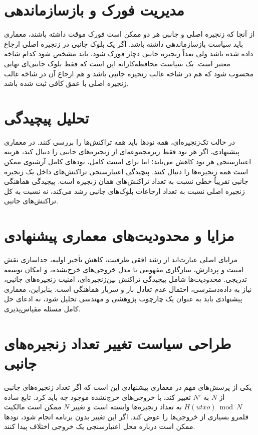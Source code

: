 \section{مدیریت فورک و بازسازماندهی}

از آنجا که زنجیره اصلی و جانبی هر دو ممکن است فورک موقت داشته باشند، معماری باید سیاست بازسازماندهی داشته باشد. اگر یک بلوک جانبی در زنجیره اصلی ارجاع داده شده باشد ولی بعداً زنجیره جانبی دچار فورک شود، باید مشخص شود کدام شاخه معتبر است. یک سیاست محافظه‌کارانه این است که فقط بلوک جانبی‌ای نهایی محسوب شود که هم در شاخه غالب زنجیره جانبی باشد و هم ارجاع آن در شاخه غالب زنجیره اصلی با عمق کافی ثبت شده باشد.

\section{تحلیل پیچیدگی}

در حالت تک‌زنجیره‌ای، همه نودها باید همه تراکنش‌ها را بررسی کنند. در معماری پیشنهادی، اگر هر نود فقط زیرمجموعه‌ای از زنجیره‌های جانبی را دنبال کند، هزینه اعتبارسنجی هر نود کاهش می‌یابد؛ اما برای امنیت کامل، نودهای کامل آرشیوی ممکن است همه زنجیره‌ها را دنبال کنند. پیچیدگی اعتبارسنجی تراکنش‌های داخل یک زنجیره جانبی تقریباً خطی نسبت به تعداد تراکنش‌های همان زنجیره است. پیچیدگی هماهنگی زنجیره اصلی نسبت به تعداد ارجاعات بلوک‌های جانبی رشد می‌کند، نه نسبت به کل تراکنش‌های جانبی.

\section{مزایا و محدودیت‌های معماری پیشنهادی}

مزایای اصلی عبارت‌اند از رشد افقی ظرفیت، کاهش تأخیر اولیه، جداسازی نقش امنیت و پردازش، سازگاری مفهومی با مدل خروجی‌های خرج‌نشده، و امکان توسعه تدریجی. محدودیت‌ها شامل پیچیدگی تراکنش بین‌زنجیره‌ای، امنیت زنجیره‌های جانبی، نیاز به داده‌دسترسی، احتمال عدم تعادل بار و سربار هماهنگی است. بنابراین، معماری پیشنهادی باید به عنوان یک چارچوب پژوهشی و مهندسی تحلیل شود، نه ادعای حل کامل مسئله مقیاس‌پذیری.

\section{طراحی سیاست تغییر تعداد زنجیره‌های جانبی}

یکی از پرسش‌های مهم در معماری پیشنهادی این است که اگر تعداد زنجیره‌های جانبی از \(N\) به \(N'\) تغییر کند، با خروجی‌های خرج‌نشده موجود چه باید کرد. تابع ساده \(H(utxo) \bmod N\) به تعداد زنجیره‌ها وابسته است و تغییر \(N\) ممکن است مالکیت قلمرو بسیاری از خروجی‌ها را عوض کند. اگر این تغییر بدون برنامه انجام شود، نودها ممکن است درباره محل اعتبارسنجی یک خروجی اختلاف پیدا کنند.

